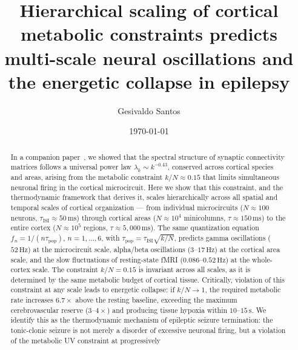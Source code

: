 \documentclass[aps,pre,twocolumn,showpacs,superscriptaddress,longbibliography]{revtex4-2}
\newcommand{\kN}{k/N}
\newcommand{\taupop}{\tau_{\mathrm{pop}}}
\newcommand{\tauISI}{\tau_{\mathrm{ISI}}}
\begin{document}
\title{Hierarchical scaling of cortical metabolic constraints
       predicts multi-scale neural oscillations and
       the energetic collapse in epilepsy}

\author{Gesivaldo Santos}

\date{\today}

\begin{abstract}
In a companion paper~\cite{Santos2025a}, we showed that the
spectral structure of synaptic connectivity matrices follows
a universal power law $\lambda_k \sim k^{-0.43}$, conserved
across cortical species and areas, arising from the metabolic
constraint $\kN \approx 0.15$ that limits simultaneous neuronal
firing in the cortical microcircuit. Here we show that this
constraint, and the thermodynamic framework that derives it,
scales hierarchically across all spatial and temporal scales of
cortical organization --- from individual microcircuits
($N \approx 100$ neurons, $\tauISI \approx 50\,\mathrm{ms}$)
through cortical areas ($N \approx 10^4$ minicolumns,
$\tau \approx 150\,\mathrm{ms}$) to the entire cortex
($N \approx 10^5$ regions, $\tau \approx 5{,}000\,\mathrm{ms}$).
The same quantization equation $f_n = 1/(n\taupop)$,
$n = 1,\ldots,6$, with $\taupop = \tauISI\sqrt{\kN}$,
predicts gamma oscillations ($52\,\mathrm{Hz}$) at the
microcircuit scale, alpha/beta oscillations ($3$--$17\,\mathrm{Hz}$)
at the cortical area scale, and the slow fluctuations of
resting-state fMRI ($0.086$--$0.52\,\mathrm{Hz}$) at the
whole-cortex scale. The constraint $\kN = 0.15$ is invariant
across all scales, as it is determined by the same metabolic
budget of cortical tissue. Critically, violation of this
constraint at any scale leads to energetic collapse: if
$\kN \to 1$, the required metabolic rate increases $6.7\times$
above the resting baseline, exceeding the maximum cerebrovascular
reserve ($3$--$4\times$) and producing tissue hypoxia within
$10$--$15\,\mathrm{s}$. We identify this as the thermodynamic
mechanism of epileptic seizure termination: the tonic-clonic
seizure is not merely a disorder of excessive neuronal firing,
but a violation of the metabolic UV constraint at progressively

\end{abstract}
\end{document}
